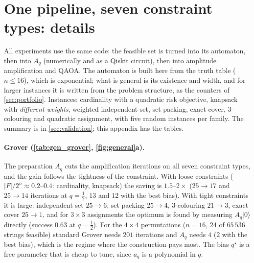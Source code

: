 \section{One pipeline, seven constraint types: details}\label{sec:pipeline}
All experiments use the same code: the feasible set is turned into its automaton, then into $A_q$ (numerically and as a Qiskit circuit), then into amplitude amplification and QAOA. The automaton is built here from the truth table ($n\le16$), which is exponential; what is general is its existence and width, and for larger instances it is written from the problem structure, as the counters of \cref{sec:portfolio}. Instances: cardinality with a quadratic risk objective, knapsack with \emph{different weights}, weighted independent set, set packing, exact cover, 3-colouring and quadratic assignment, with five random instances per family. The summary is in \cref{sec:validation}; this appendix has the tables.









\paragraph{Grover (\cref{tab:gen_grover}, \cref{fig:general}a).} The preparation $A_q$ cuts the amplification iterations on all seven constraint types, and the gain follows the tightness of the constraint. With loose constraints ($|F|/2^n\approx0.2$--$0.4$: cardinality, knapsack) the saving is $1.5$--$2\times$ ($25\to17$ and $25\to14$ iterations at $q=\tfrac12$, $13$ and $12$ with the best bias). With tight constraints it is large: independent set $25\to6$, set packing $25\to4$, 3-colouring $21\to3$, exact cover $25\to1$, and for $3\times3$ assignments the optimum is found by measuring $A_q|0\rangle$ directly (success $0.63$ at $q=\tfrac12$). For the $4\times4$ permutations ($n=16$, $24$ of $65\,536$ strings feasible) standard Grover needs $201$ iterations and $A_q$ needs $4$ ($2$ with the best bias), which is the regime where the construction pays most. The bias $q^\star$ is a free parameter that is cheap to tune, since $a_q$ is a polynomial in $q$.

